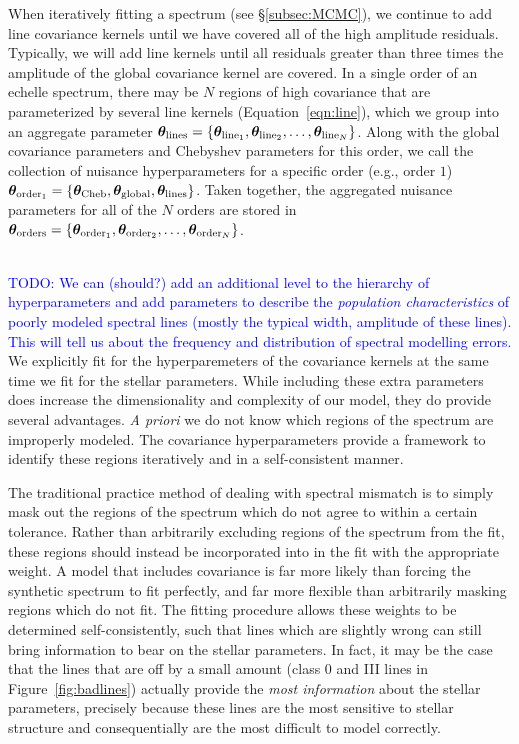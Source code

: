 \documentclass[preprint]{aastex} %
\newcommand{\vt}{ {\bm \theta}}
\newcommand{\vtcheb}{\vt_{\rm Cheb}}
\newcommand{\vtglobal}{\vt_{\rm global}}
\newcommand{\vtorder}[1]{\vt_{{\rm order}_{#1}}}
\newcommand{\vtorders}{\vt_{\rm orders}}
\newcommand{\vtline}[1]{\vt_{{\rm line}_{#1}}}
\newcommand{\vtlines}{\vt_{\rm lines}}
\newcommand{\todo}[1]{ \textcolor{Blue}{\\TODO: #1}}
\begin{document}
When iteratively fitting a spectrum (see \S\ref{subsec:MCMC}), we continue to add line covariance kernels until we have covered all of the high amplitude residuals. Typically, we will add line kernels until all residuals greater than three times the amplitude of the global covariance kernel are covered. In a single order of an echelle spectrum, there may be $N$ regions of high covariance that are parameterized by several line kernels (Equation~\ref{eqn:line}), which we group into an aggregate parameter $\vtlines = \{\vtline{1}, \vtline{2}, \ldots, \vtline{N}\}$. Along with the global covariance parameters and Chebyshev parameters for this order, we call the collection of nuisance hyperparameters for a specific order  (e.g., order $1$) $\vtorder{1} = \{\vtcheb, \vtglobal, \vtlines\}$. Taken together, the aggregated nuisance parameters for all of the $N$ orders are stored in $\vtorders = \{\vtorder{1}, \vtorder{2}, \ldots, \vtorder{N} \}$.

\todo{We can (should?) add an additional level to the hierarchy of
  hyperparameters and add parameters to describe the \emph{population
  characteristics} of poorly modeled spectral lines (mostly the typical width,
  amplitude of these lines).  This will tell us about the frequency and
distribution of spectral modelling errors.} 
We explicitly fit for the hyperparemeters of the covariance kernels at the same
time we fit for the stellar parameters. While including these extra
parameters does increase the dimensionality and complexity of our model, they do provide several advantages. \emph{A priori} we do not know which
regions of the spectrum are improperly modeled. The covariance hyperparameters provide a framework to identify these regions iteratively and in a self-consistent manner. 

The traditional practice method of dealing with spectral mismatch is to simply mask out the regions of the spectrum which do not agree to within a certain tolerance.  Rather than arbitrarily excluding regions of the spectrum from the fit, these regions should instead be incorporated into in the fit with the appropriate weight. A model that includes covariance is far more likely than forcing the synthetic spectrum to fit perfectly, and far more flexible than arbitrarily masking regions which do not fit. The fitting procedure allows these weights to be determined self-consistently, such that lines which are slightly wrong can still bring information to bear on the stellar parameters. In fact, it may be the case that the lines that are off by a small amount (class 0 and III lines in Figure~\ref{fig:badlines}) actually provide the \emph{most information} about the stellar parameters, precisely because these lines are the most sensitive to stellar structure and consequentially are the most difficult to model correctly.
\end{document}
